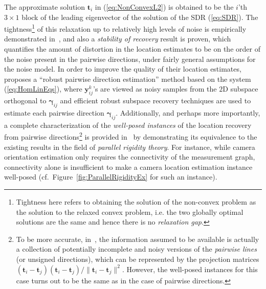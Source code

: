\documentclass[10pt]{article}
\begin{document}
The approximate solution $\mathbf{t}_i$ in (\ref{eq:NonConvexL2}) is obtained to be the $i$'th $3\times1$ block of the leading eigenvector of the solution of the SDR (\ref{eq:SDR}). The tightness\footnote{Tightness here refers to obtaining the solution of the non-convex problem as the solution to the relaxed convex problem, i.e. the two globally optimal solutions are the same and hence there is no \textit{relaxation gap}.} of this relaxation up to relatively high levels of noise is empirically demonstrated in~\cite{CvXSfM}, and also a \textit{stability of recovery} result is proven, which quantifies the amount of distortion in the location estimates to be on the order of the noise present in the pairwise directions, under fairly general assumptions for the noise model. In order to improve the quality of their location estimates, \cite{CvXSfM} proposes a ``robust pairwise direction estimation'' method based on the system (\ref{eq:HomLinEqs}), where $\mathbf{y}_{ij}^k$'s are viewed as noisy samples from the $2$D subspace orthogonal to $\mathbf{\gamma}_{ij}$ and efficient robust subspace recovery techniques are used to estimate each pairwise direction $\mathbf{\gamma}_{ij}$. Additionally, and perhaps more importantly, a complete characterization of the \textit{well-posed instances} of the location recovery from pairwise directions\footnote{To be more accurate, in~\cite{CvXSfM}, the information assumed to be available is actually a collection of potentially incomplete and noisy versions of the \textit{pairwise lines} (or unsigned directions), which can be represented by the projection matrices $(\mathbf{t}_i-\mathbf{t}_j)(\mathbf{t}_i-\mathbf{t}_j)/\|\mathbf{t}_i-\mathbf{t}_j\|^2$. However, the well-posed instances for this case turns out to be the same as in the case of pairwise directions.} is provided in~\cite{CvXSfM} by demonstrating its equivalence to the existing results in the field of \textit{parallel rigidity theory}. For instance, while camera orientation estimation only requires the connectivity of the measurement graph, connectivity alone is insufficient to make a camera location estimation instance well-posed (cf.~Figure~\ref{fig:ParallelRigidityEx} for such an instance).
\end{document}
